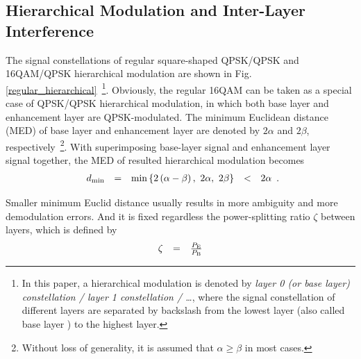 \documentclass[10pt,fleqn, twocolumn]{IEEEtran}
\begin{document}
\subsection{Hierarchical Modulation and Inter-Layer Interference}

The signal constellations of regular square-shaped QPSK/QPSK and
16QAM/QPSK hierarchical modulation are shown in Fig.
\ref{regular_hierarchical}~\footnote{In this paper, a hierarchical
modulation is denoted by {\em layer 0 (or base layer)
constellation / layer 1 constellation / \ldots}, where the signal
constellation of different layers are separated by backslash from
the lowest layer (also called base layer ) to the highest layer.
}. Obviously, the regular 16QAM can be taken as a special case of
QPSK/QPSK hierarchical modulation, in which both base layer and
enhancement layer are QPSK-modulated. The minimum Euclidean
distance (MED) of base layer and enhancement layer are denoted by
$2\alpha$ and $2\beta$, respectively~\footnote{Without loss of
generality, it is assumed that $\alpha\geq\beta$ in most cases.}.
With superimposing base-layer signal and enhancement layer signal
together, the MED of resulted hierarchical modulation becomes
\begin{equation}
\begin{array}{rcccl}
d_{\rm min}& = & \min\left\{2\left(\alpha-\beta\right),\ 2\alpha,\
2\beta\right\}&<& 2\alpha
\end{array}.\label{Regular_MED}
\end{equation}
\begin{figure}
\end{figure}
\noindent Smaller minimum Euclid distance usually results in more
ambiguity and more demodulation errors.
And it is fixed regardless
the power-splitting ratio $\zeta$ between layers, which is defined
by
\begin{equation}
\begin{array}{rcl}
\zeta & = & \frac{P_{\rm E}}{P_{\rm B}}
\end{array}\label{power_ratio}
\end{equation}
\end{document}
